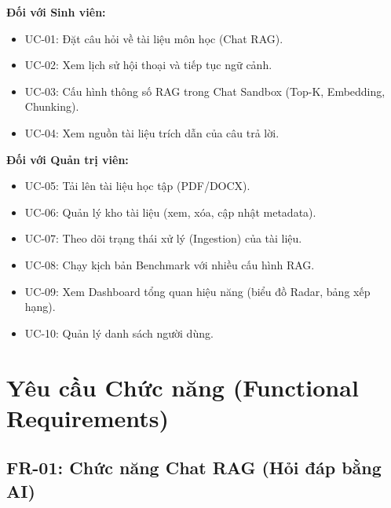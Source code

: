 \textbf{Đối với Sinh viên:}
\begin{itemize}[itemsep=2pt]
  \item UC-01: Đặt câu hỏi về tài liệu môn học (Chat RAG).
  \item UC-02: Xem lịch sử hội thoại và tiếp tục ngữ cảnh.
  \item UC-03: Cấu hình thông số RAG trong Chat Sandbox (Top-K, Embedding, Chunking).
  \item UC-04: Xem nguồn tài liệu trích dẫn của câu trả lời.
\end{itemize}

\textbf{Đối với Quản trị viên:}
\begin{itemize}[itemsep=2pt]
  \item UC-05: Tải lên tài liệu học tập (PDF/DOCX).
  \item UC-06: Quản lý kho tài liệu (xem, xóa, cập nhật metadata).
  \item UC-07: Theo dõi trạng thái xử lý (Ingestion) của tài liệu.
  \item UC-08: Chạy kịch bản Benchmark với nhiều cấu hình RAG.
  \item UC-09: Xem Dashboard tổng quan hiệu năng (biểu đồ Radar, bảng xếp hạng).
  \item UC-10: Quản lý danh sách người dùng.
\end{itemize}

\section{Yêu cầu Chức năng (Functional Requirements)}

\subsection{FR-01: Chức năng Chat RAG (Hỏi đáp bằng AI)}

